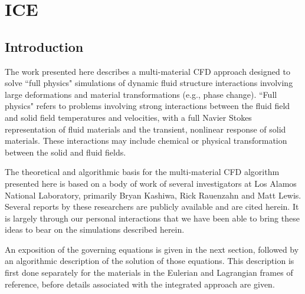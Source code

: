 \newcommand{\SUM}{\raise1.5pt\hbox{$\scriptstyle\sum_{s=1}^N$}}
\newcommand {\cc}{\tiny(CC)}
\newcommand {\fc}{\tiny(FC)}
\newcommand {\dat}{\tiny(dat)}
%   
%



\chapter{ICE} \label{Sec:ICE}


\section{Introduction}
The work presented here describes a multi-material CFD approach designed to solve ``full physics" simulations of dynamic fluid structure interactions involving large deformations and material transformations (e.g., phase change).  ``Full physics" refers to problems involving strong interactions between the fluid field and solid field temperatures and velocities, with a full Navier Stokes representation of fluid materials and the transient, nonlinear response of solid materials.  These interactions may include chemical or physical transformation between the solid and fluid fields.

The theoretical and algorithmic basis for the multi-material CFD algorithm presented here is based on a body of work of several investigators at Los Alamos National Laboratory, primarily Bryan Kashiwa, Rick Rauenzahn and Matt Lewis.  Several reports by these researchers are publicly available and are cited herein.  It is largely through our personal interactions that we have been able to bring these ideas to bear on the simulations described herein.


An exposition of the governing equations is given in the next section, followed by an algorithmic description of the solution of those equations.  This description is first done separately for the materials in the Eulerian and Lagrangian frames of reference, before details associated with the integrated approach are given. 

